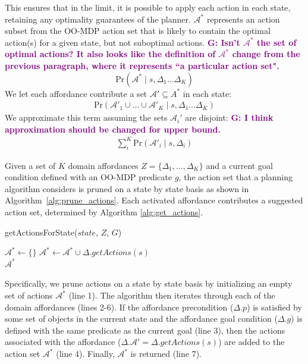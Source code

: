\documentclass[conference]{IEEEtran}
\newcommand{\gnote}[1]{\textcolor{Purple}{\textbf{G: #1}}}
\begin{document}
This ensures that in the limit, it is possible to apply each action in each state, retaining
any optimality guarantees of the planner. $\mathcal{A}^*$ represents
an action subset from the OO-MDP action set that is likely to contain the optimal action(s) for a given state,
but not suboptimal actions. \gnote{Isn't $\mathcal{A}^*$ the set of optimal actions? It also looks like the definition of $\mathcal{A}^*$ change from the previous paragraph, where it represents ``a particular action set".}
\begin{equation}
\text{Pr}(\mathcal{A}^* \mid s, \Delta_1 \dots \Delta_K)
\end{equation}
We let each affordance contribute a set $\mathcal{A}' \subseteq A^*$ in each state:
\begin{align}
\text{Pr}(\mathcal{A}'_1 \cup \ldots \cup \mathcal{A}'_K \mid s, \Delta_1 \dots \Delta_K)
\end{align}
We approximate this term assuming the sets $\mathcal{A}_i'$ are disjoint:
\gnote{I think approximation should be changed for upper bound.}
\begin{align}
\sum_i^K \text{Pr}(\mathcal{A}'_i \mid s, \Delta_i)
\end{align}

Given a set of $K$ domain affordances $Z = \{\Delta_1, ..., \Delta_K\}$ and a current 
goal condition defined with an OO-MDP predicate $g$, the action set that a 
planning algorithm considers is pruned on a state by state basis as shown in 
Algorithm~\ref{alg:prune_actions}.  Each 
activated affordance contributes a suggested action set, determined by Algorithm \ref{alg:get_actions}. 

\begin{algorithm}
  \caption{getActionsForState($state$, $Z$, $G$)}
  \begin{algorithmic}[1]
    \State $\mathcal{A}^* \leftarrow \{\}$
    \State $\mathcal{A}^* \leftarrow \mathcal{A}^* \cup \Delta.getActions(s)$
    \EndIf
    \EndFor \\
    \Return $\mathcal{A}^*$
  \end{algorithmic}
  \label{alg:prune_actions}
\end{algorithm}

Specifically, we prune actions on a state by state basis
by initializing an empty set of actions $\mathcal{A}^*$ (line 1). The algorithm then iterates
through each of the domain affordances (lines 2-6). If the affordance
precondition ($\Delta.p$) is satisfied by some set of objects in the current state
and the affordance goal condition ($\Delta.g$) is defined with the same predicate
as the current goal (line 3), then the actions associated with the affordance ($\Delta.\mathcal{A}' = \Delta.getActions(s)$) are added to the action set $\mathcal{A}^*$ (line 4). Finally, $\mathcal{A}^*$ is returned (line 7).
\end{document}
